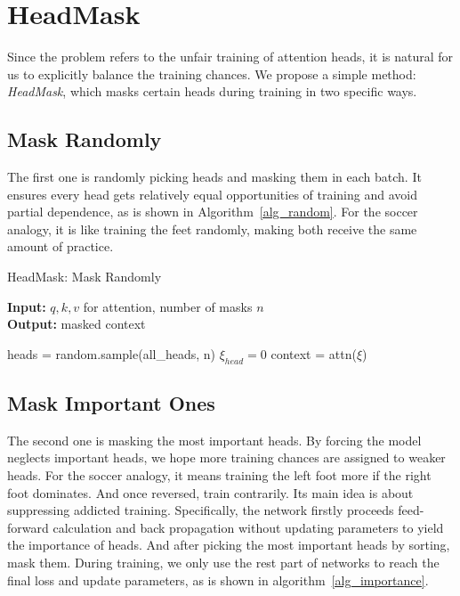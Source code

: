 \documentclass[11pt]{article}
\begin{document}
\section{HeadMask}

Since the problem refers to the unfair training of attention heads, it is natural for us to explicitly balance the training chances. We propose a simple method: \textit{HeadMask}, which masks certain heads during training in two specific ways.

\subsection{Mask Randomly}

The first one is randomly picking heads and masking them in each batch. It ensures every head gets relatively equal opportunities of training and avoid partial dependence, as is shown in Algorithm~\ref{alg_random}. For the soccer analogy, it is like training the feet randomly, making both receive the same amount of practice.

\begin{algorithm}[h]\footnotesize
    \caption{HeadMask: Mask Randomly}
    \label{alg_random}
    \begin{flushleft}
        \hspace*{0.02in} {\bf Input:} $q, k, v$ for attention, number of masks $n$\\
        \hspace*{0.02in} {\bf Output:} masked context
    \end{flushleft}
    \begin{algorithmic}[1]
            \STATE heads = random.sample(all\_heads, n)
                \STATE $\xi_{head} = 0$
            \ENDFOR
            \STATE context = attn($\xi$)
        \ENDFOR
    \end{algorithmic}
\end{algorithm}

\subsection{Mask Important Ones}

The second one is masking the most important heads. By forcing the model neglects important heads, we hope more training chances are assigned to weaker heads. For the soccer analogy, it means training the left foot more if the right foot dominates. And once reversed, train contrarily. Its main idea is about suppressing addicted training. Specifically, the network firstly proceeds feed-forward calculation and back propagation without updating parameters to yield the importance of heads. And after picking the most important heads by sorting, mask them. During training, we only use the rest part of networks to reach the final loss and update parameters, as is shown in algorithm~\ref{alg_importance}.
\end{document}
